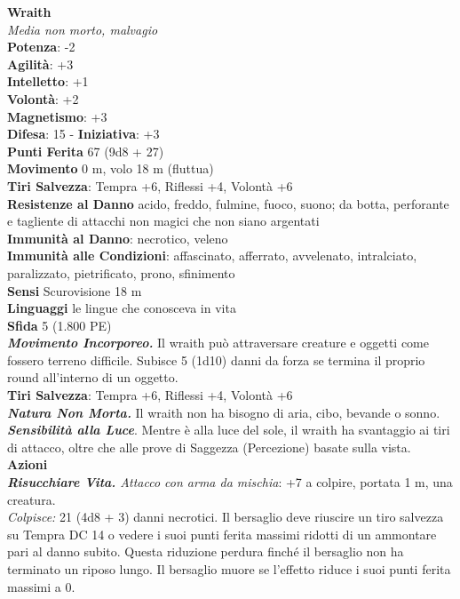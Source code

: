 \begin{multicols}{2}
\medskip\textbf{Wraith}\\
\emph{Media non morto, malvagio}\\
\textbf{Potenza}: -2\\
\textbf{Agilità}: +3\\
\textbf{Intelletto}: +1\\
\textbf{Volontà}: +2\\
\textbf{Magnetismo}: +3\\
\textbf{Difesa}: 15 - \textbf{Iniziativa}: +3\\
\textbf{Punti Ferita} 67 (9d8 + 27)\\
\textbf{Movimento} 0 m, volo 18 m (fluttua)\\
\textbf{Tiri Salvezza}: Tempra +6, Riflessi +4, Volontà +6\\
\textbf{Resistenze al Danno} acido, freddo, fulmine, fuoco, suono; da botta, perforante e tagliente di attacchi non magici che non siano argentati\\
\textbf{Immunità al Danno}: necrotico, veleno\\
\textbf{Immunità alle Condizioni}: affascinato, afferrato, avvelenato, intralciato, paralizzato, pietrificato, prono, sfinimento\\
\textbf{Sensi} Scurovisione 18 m\\
\textbf{Linguaggi} le lingue che conosceva in vita\\
\textbf{Sfida} 5 (1.800 PE)\smallskip\\
\emph{\textbf{Movimento Incorporeo.}} Il wraith può attraversare creature e oggetti come fossero terreno difficile. Subisce 5 (1d10) danni da forza se termina il proprio round all'interno di un oggetto.\\
\textbf{Tiri Salvezza}: Tempra +6, Riflessi +4, Volontà +6\\
\emph{\textbf{Natura Non Morta.}} Il wraith non ha bisogno di aria, cibo, bevande o sonno.\\
\emph{\textbf{Sensibilità alla Luce}}. Mentre è alla luce del sole, il wraith ha svantaggio ai tiri di attacco, oltre che alle prove di Saggezza (Percezione) basate sulla vista.\\
\smallskip\textbf{Azioni}\\
\emph{\textbf{Risucchiare Vita.} Attacco con arma da mischia}: +7 a colpire, portata 1 m, una creatura.\\
\emph{Colpisce:} 21 (4d8 + 3) danni necrotici. Il bersaglio deve riuscire un tiro salvezza su Tempra DC 14 o vedere i suoi punti ferita massimi ridotti di un ammontare pari al danno subito. Questa riduzione perdura finché il bersaglio non ha terminato un riposo lungo. Il bersaglio muore se l'effetto riduce i suoi punti ferita massimi a 0.\\


\end{multicols}
